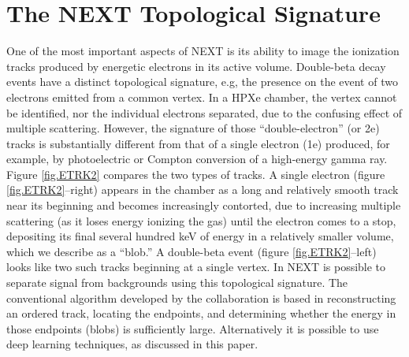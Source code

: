 \documentclass[a4paper,11pt]{article}
\begin{document}
\section{The NEXT Topological Signature}\label{sec:topology}
One of the most important aspects of NEXT is its ability to image the ionization tracks produced by energetic electrons in its active volume.  Double-beta decay events have a distinct
topological signature, e.g, the presence on the event of two electrons emitted from a common vertex. In a HPXe chamber, the vertex cannot be identified, nor the individual electrons separated, due to the confusing effect of multiple scattering. However, the signature of those ``double-electron'' (or 2e) tracks is substantially different from that of a single electron (1e) produced, for example, by photoelectric or Compton 
conversion of a high-energy gamma ray.  Figure \ref{fig.ETRK2} compares the two types of
tracks. A single electron (figure  \ref{fig.ETRK2}--right) appears in the chamber as a long and relatively smooth track near its beginning and becomes increasingly contorted, due to increasing multiple scattering (as it loses energy ionizing the gas) until the electron comes to a stop, depositing
its final several hundred keV of energy in a relatively smaller volume, which we describe as a ``blob.'' 
A double-beta event (figure  \ref{fig.ETRK2}--left)  looks like two such tracks beginning at a single vertex.  
In NEXT is possible to separate signal from backgrounds using this topological signature. The conventional algorithm developed by the collaboration is based in reconstructing an ordered
track, locating the endpoints, and determining whether the energy in those endpoints (blobs) is sufficiently large. Alternatively it is possible to use deep learning techniques, as discussed in this paper.   
\end{document}
